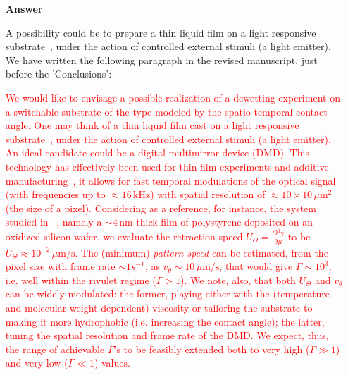 \documentclass[12pt,english]{article}
\newcommand{\JH}[1]{\textcolor{blue}{JH: #1}}
\begin{document}
\begin{itemize}
\item[ \textbf{{Answer}}]
{
A possibility could be to prepare a thin liquid film on a light responsive substrate~\cite{IchimuraEtAl_Science2000}, under the action of controlled 
external stimuli (a light emitter). We have written the following paragraph in the revised
manuscript, just before the 'Conclusions':

\textcolor{red}{We would like to envisage a possible realization of a 
dewetting experiment on a switchable substrate of the type modeled by the spatio-temporal 
contact angle. One may think of a thin liquid film cast on a light responsive substrate~\cite{IchimuraEtAl_Science2000}, under the action of controlled 
external stimuli (a light emitter). An ideal candidate could be a digital multimirror device (DMD).
This technology has effectively been used for thin film experiments and additive manufacturing~\cite{doi:10.1021/jp301092y, doi:10.1126/science.aax8760}, it allows for fast temporal modulations of the optical signal (with frequencies up to $\approx 16 \, \text{kHz}$)
with spatial resolution of $\approx 10 \times 10 \, \mu \text{m}^2$ (the size of a pixel).
Considering as a reference, for instance, the system studied in ~\cite{becker2003complex,PhysRevLett.99.114503}, namely a $\sim 4 \, \text{nm}$ thick film 
of polystyrene deposited on an oxidized silicon wafer,  
we evaluate the retraction speed 
$U_{\Theta} = \frac{\Theta^3 \gamma}{9 \mu}$ to be 
$U_{\Theta} \approx 10^{-2} \, \mu \text{m}/\text{s}$. 
The (minimum) {\it pattern speed} can be 
estimated, from the pixel size with frame rate $\sim 1 s^{-1}$, as 
$v_{\theta} \sim 10 \, \mu \text{m}/\text{s}$, that would give $\Gamma \sim 10^3$, i.e. well within 
the rivulet regime ($\Gamma > 1$). We note, also, that both $U_{\Theta}$ and $v_{\theta}$ can 
be widely modulated: the former, playing either with the (temperature and molecular weight dependent) viscosity 
or tailoring the substrate to making it more hydrophobic (i.e. increasing the contact angle); the latter, tuning
the spatial resolution and frame rate of the DMD. We expect, thus, the range of achievable $\Gamma$'s to 
be feasibly extended both to very high ($\Gamma \gg 1$) and very low ($\Gamma \ll 1$) values.} 

}
\end{itemize}
\end{document}
